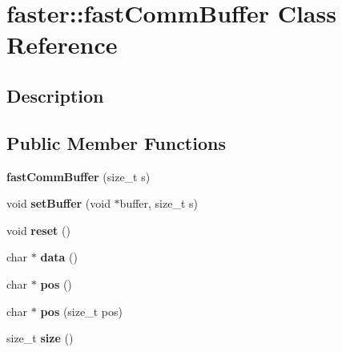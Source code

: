 \hypertarget{classfaster_1_1fastCommBuffer}{}\section{faster\+:\+:fast\+Comm\+Buffer Class Reference}
\label{classfaster_1_1fastCommBuffer}


\subsection{Description}
\subsection*{Public Member Functions}
\begin{DoxyCompactItemize}
\item 
\hypertarget{classfaster_1_1fastCommBuffer_a60faa2120500844f9d68146589ad1e28}{}\label{classfaster_1_1fastCommBuffer_a60faa2120500844f9d68146589ad1e28} 
{\bfseries fast\+Comm\+Buffer} (size\+\_\+t s)
\item 
\hypertarget{classfaster_1_1fastCommBuffer_a87c0afe4a7fcfdb7ba5081d2ed1548c9}{}\label{classfaster_1_1fastCommBuffer_a87c0afe4a7fcfdb7ba5081d2ed1548c9} 
void {\bfseries set\+Buffer} (void $\ast$buffer, size\+\_\+t s)
\item 
\hypertarget{classfaster_1_1fastCommBuffer_a42bb6c351e24f2481ba87253970a8c93}{}\label{classfaster_1_1fastCommBuffer_a42bb6c351e24f2481ba87253970a8c93} 
void {\bfseries reset} ()
\item 
\hypertarget{classfaster_1_1fastCommBuffer_a1198c2a18c17b5beb445e11233e9bde1}{}\label{classfaster_1_1fastCommBuffer_a1198c2a18c17b5beb445e11233e9bde1} 
char $\ast$ {\bfseries data} ()
\item 
\hypertarget{classfaster_1_1fastCommBuffer_a9e502793614ad5d6f6b35d26e85a7d76}{}\label{classfaster_1_1fastCommBuffer_a9e502793614ad5d6f6b35d26e85a7d76} 
char $\ast$ {\bfseries pos} ()
\item 
\hypertarget{classfaster_1_1fastCommBuffer_a5a4223d28d9d9199bacba3342667b93a}{}\label{classfaster_1_1fastCommBuffer_a5a4223d28d9d9199bacba3342667b93a} 
char $\ast$ {\bfseries pos} (size\+\_\+t pos)
\item 
\hypertarget{classfaster_1_1fastCommBuffer_ad2896c8812e3e482568980847781afe8}{}\label{classfaster_1_1fastCommBuffer_ad2896c8812e3e482568980847781afe8} 
size\+\_\+t {\bfseries size} ()
\item 
\hypertarget{classfaster_1_1fastCommBuffer_ad0987ec778beba50de88ca2e2bc6ef44}{}\label{classfaster_1_1fastCommBuffer_ad0987ec778beba50de88ca2e2bc6ef44} 

\end{DoxyCompactItemize}
